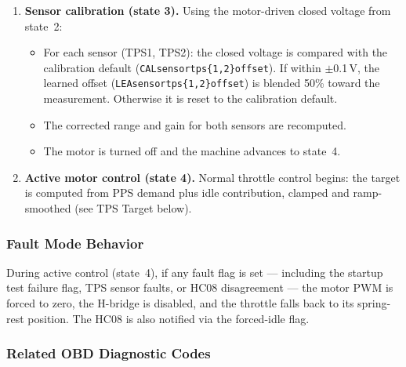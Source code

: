 \documentclass[a4paper,11pt]{article}
\renewcommand{\_}{\oldunderscore\allowbreak}
\begin{document}
\begin{enumerate}
	\item \textbf{Sensor calibration (state 3).}
	      Using the motor-driven closed voltage from state~2:
	      \begin{itemize}
	      \item For each sensor (TPS1, TPS2): the closed voltage is compared
	            with the calibration default
	            (\texttt{CAL\_sensor\_tps\_\{1,2\}\_offset}). If within
	            $\pm$0.1\,V, the learned offset
	            (\texttt{LEA\_sensor\_tps\_\{1,2\}\_offset}) is blended 50\%
	            toward the measurement. Otherwise it is reset to the
	            calibration default.
	      \item The corrected range and gain for both sensors are recomputed.
	      \item The motor is turned off and the machine advances to state~4.
	      \end{itemize}

	\item \textbf{Active motor control (state 4).}
	      Normal throttle control begins: the target is computed from PPS demand
	      plus idle contribution, clamped and ramp-smoothed (see TPS Target
	      below).
\end{enumerate}

\subsubsection*{Fault Mode Behavior}

During active control (state~4), if any fault flag is set --- including the
startup test failure flag, TPS sensor faults, or HC08 disagreement --- the motor
PWM is forced to zero, the H-bridge is disabled, and the throttle falls back to
its spring-rest position. The HC08 is also notified via the forced-idle flag.

\subsubsection*{Related OBD Diagnostic Codes}
\end{document}
